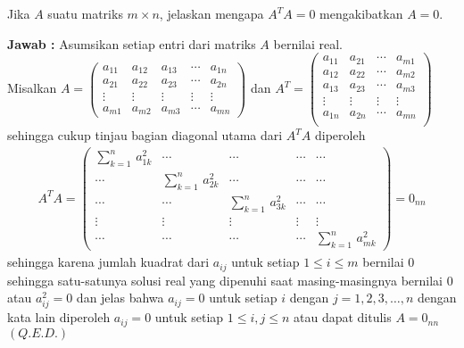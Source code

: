 \documentclass[11pt,a4paper]{article}
\theoremstyle{plain}
\theoremstyle{definition}
\theoremstyle{remark}
\begin{document}
\begin{enumerate}
\begin{enumerate}
		
		\textbf{Jawab :}
		Asumsikan setiap entri dari matriks $A$ bernilai real.\\
		Misalkan $A=\begin{pmatrix}
		a_{11} & a_{12} & a_{13} & \cdots & a_{1n}\\ 
		a_{21} & a_{22} & a_{23} & \cdots & a_{2n}\\ 
		\vdots & \vdots & \vdots & \vdots & \vdots\\ 
		a_{m1} & a_{m2} & a_{m3} & \cdots & a_{mn}
		\end{pmatrix}$ dan $A^{T}=\begin{pmatrix}
		a_{11} & a_{21} & \cdots & a_{m1}\\ 
		a_{12} & a_{22} & \cdots & a_{m2}\\ 
		a_{13} & a_{23} & \cdots & a_{m3}\\
		\vdots & \vdots & \vdots & \vdots\\ 
		a_{1n} & a_{2n} & \cdots & a_{mn}\\
		\end{pmatrix}$
		sehingga cukup tinjau bagian diagonal utama dari $A^{T}A$ diperoleh
		\begin{align*}
		A^{T}A=\begin{pmatrix}
		\displaystyle \sum_{k=1}^{n}\, a_{1k}^{2} & \cdots & \cdots & \cdots & \cdots \\ 
		\cdots & \displaystyle \sum_{k=1}^{n}\, a_{2k}^{2} & \cdots & \cdots & \cdots \\ 
		\cdots & \cdots & \displaystyle \sum_{k=1}^{n}\, a_{3k}^{2} & \cdots & \cdots \\ 
		\vdots & \vdots & \vdots & \vdots & \vdots \\ 
		\cdots & \cdots & \cdots & \cdots & \displaystyle \sum_{k=1}^{n}\, a_{mk}^{2}
		\end{pmatrix}=0_{nn}
		\end{align*}
		sehingga karena jumlah kuadrat dari $a_{ij}$ untuk setiap $1\le i\le m$ bernilai $0$ sehingga satu-satunya solusi real yang dipenuhi saat masing-masingnya bernilai $0$ atau $a_{ij}^{2}=0$ dan jelas bahwa $a_{ij}=0$ untuk setiap $i$ dengan $j=1,2,3,\ldots,n$ dengan kata lain diperoleh $a_{ij}=0$ untuk setiap $1\le i,j\le n$ atau dapat ditulis $A=0_{nn}$ $(Q.E.D.)$ 
		

\end{enumerate}
\end{enumerate}
\end{document}
